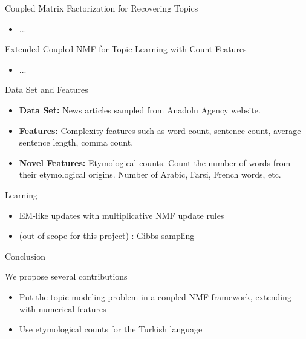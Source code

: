 \documentclass[pdf]{beamer}
\begin{document}
\begin{frame}{Coupled Matrix Factorization for Recovering Topics}
	
	\begin{itemize}
		\item ...
	\end{itemize}
	
\end{frame}

\begin{frame}{Extended Coupled NMF for Topic Learning with Count Features}
	
	\begin{itemize}
		\item ...
	\end{itemize}
	
\end{frame}


\begin{frame}{Data Set and Features}
	
	\begin{itemize}
		\item {\bf Data Set:} News articles sampled from Anadolu Agency website. 
		\item {\bf Features:} Complexity features such as word count, sentence count, average sentence length, comma count.
		\item {\bf Novel Features:} Etymological counts. Count the number of words from their etymological origins. Number of Arabic, Farsi, French words, etc.
	\end{itemize}
	
\end{frame}

\begin{frame}{Learning}
	
	\begin{itemize}
		\item EM-like updates with multiplicative NMF update rules 
		\item (out of scope for this project) : Gibbs sampling
	\end{itemize}
	
\end{frame}

\begin{frame}{Conclusion}
	
	We propose several contributions
	\begin{itemize}
		\item Put the topic modeling problem in a coupled NMF framework, extending with numerical features
		\item Use etymological counts for the Turkish language
	\end{itemize}
	
\end{frame}

{}

\end{document}
